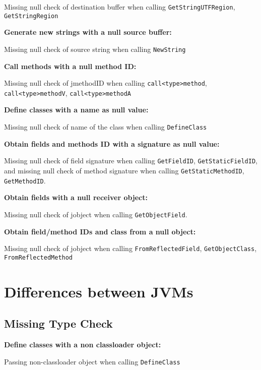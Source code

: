 \documentclass[10pt]{article}
\begin{document}
Missing null check of destination buffer when calling {\tt GetStringUTFRegion}, {\tt GetStringRegion} 

\vspace{3mm}
\noindent \textbf{Generate new strings with a null source buffer:}

Missing null check of source string when calling {\tt NewString}

\vspace{3mm}
\noindent \textbf{Call methods with a null method ID:}

Missing null check of jmethodID when calling {\tt call<type>method}, {\tt call<type>methodV}, {\tt call<type>methodA} 

\vspace{3mm}
\noindent \textbf{Define classes with a name as null value:}

Missing null check of name of the class when calling {\tt DefineClass}

\vspace{3mm}
\noindent \textbf{Obtain fields and methods ID with a signature as null value:}

Missing null check of field signature when calling {\tt GetFieldID}, {\tt GetStaticFieldID}, and
missing null check of method signature when calling {\tt GetStaticMethodID}, {\tt GetMethodID}.

\vspace{3mm}
\noindent \textbf{Obtain fields with a null receiver object:}

Missing null check of jobject when calling {\tt GetObjectField}.

\vspace{3mm}
\noindent \textbf{Obtain field/method IDs and class from a null object:}

Missing null check of jobject when calling {\tt FromReflectedField}, {\tt GetObjectClass}, {\tt FromReflectedMethod}


\section{Differences between JVMs}
\subsection{Missing Type Check}

\vspace{3mm}
\noindent \textbf{Define classes with a non classloader object:}

Passing non-classloader object when calling {\tt DefineClass}
\end{document}
